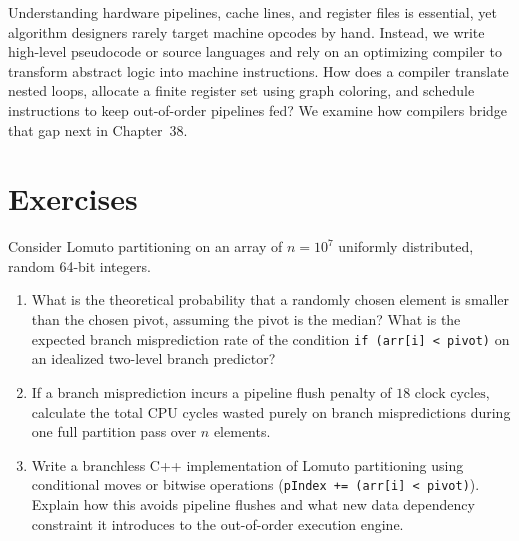 Understanding hardware pipelines, cache lines, and register files is essential,
yet algorithm designers rarely target machine opcodes by hand. Instead, we write
high-level pseudocode or source languages and rely on an optimizing compiler to
transform abstract logic into machine instructions. How does a compiler translate
nested loops, allocate a finite register set using graph coloring, and schedule
instructions to keep out-of-order pipelines fed? We examine how compilers bridge
that gap next in Chapter~38.

\section*{Exercises}

\begin{exercise}
\label{ch40:ex-quicksort-branchless}
Consider Lomuto partitioning on an array of $n = 10^7$ uniformly distributed, random 64-bit integers.
\begin{enumerate}[itemsep=0pt]
    \item What is the theoretical probability that a randomly chosen element is smaller than the chosen pivot, assuming the pivot is the median? What is the expected branch misprediction rate of the condition \texttt{if (arr[i] < pivot)} on an idealized two-level branch predictor?
    \item If a branch misprediction incurs a pipeline flush penalty of $18\text{ clock cycles}$, calculate the total CPU cycles wasted purely on branch mispredictions during one full partition pass over $n$ elements.
    \item Write a branchless C++ implementation of Lomuto partitioning using conditional moves or bitwise operations (\texttt{pIndex += (arr[i] < pivot)}). Explain how this avoids pipeline flushes and what new data dependency constraint it introduces to the out-of-order execution engine.
\end{enumerate}
\end{exercise}

